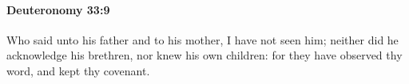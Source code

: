
		\paragraph{Deuteronomy 33:9} %
			\label{DEUTERONOMY-33-9}

			Who said unto his father and to his mother, I have not seen him; neither did he acknowledge his brethren, nor knew his own children: for they have observed thy word, and kept thy covenant.


